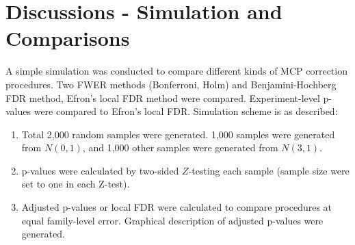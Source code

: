 \documentclass[a4paper, 11pt, oneside]{article}
\begin{document}
\vspace{0.2in}


\section{Discussions - Simulation and Comparisons}
A simple simulation was conducted to compare different kinds of MCP correction procedures. Two FWER methods (Bonferroni, Holm) and Benjamini-Hochberg FDR method, Efron's local FDR method were compared. Experiment-level p-values were compared to Efron's local FDR. Simulation scheme is as described:
\begin{enumerate}
  \item Total 2,000 random samples were generated. 1,000 samples were generated from $N(0, 1)$, and 1,000 other samples were generated from $N(3, 1)$.
  \item p-values were calculated by two-sided $Z$-testing each sample (sample size were set to one in each Z-test).
 \item Adjusted p-values or local FDR were calculated to compare procedures at equal family-level error. Graphical description of adjusted p-values were generated.
\end{enumerate}
\end{document}
